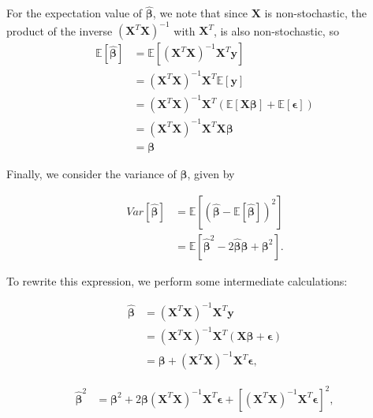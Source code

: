 \documentclass[12pt]{article}
\begin{document}
For the expectation value of $\hat{\boldsymbol{\beta}}$, we note that since $\mathbf{X}$ is non-stochastic, the product of the inverse $\left( \mathbf{X}^T \mathbf{X} \right)^{-1}$ with $\mathbf{X}^T$, is also non-stochastic, so
\begin{align}
    \mathbb{E} \left[ \hat{\boldsymbol{\beta}} \right] &= \mathbb{E} \left[ \left( \mathbf{X}^T \mathbf{X} \right)^{-1} \mathbf{X}^T \mathbf{y} \right] \nonumber\nonumber \\
    &= \left( \mathbf{X}^T \mathbf{X} \right)^{-1} \mathbf{X}^T \mathbb{E} \left[ \mathbf{y} \right] \nonumber\nonumber \\
    &= \left( \mathbf{X}^T \mathbf{X} \right)^{-1} \mathbf{X}^T \left( \mathbb{E} \left[ \mathbf{X}\boldsymbol{\beta}\right] + \mathbb{E} \left[\boldsymbol{\epsilon}\right] \right) \nonumber\nonumber \\
    &= \left( \mathbf{X}^T \mathbf{X} \right)^{-1} \mathbf{X}^T \mathbf{X}\boldsymbol{\beta} \nonumber\nonumber \\
    &= \boldsymbol{\beta}
\end{align}


Finally, we consider the variance of $\hat{\boldsymbol{\beta}}$, given by

\begin{align}
    Var \left[\hat{\boldsymbol{\beta}} \right] &= \mathbb{E} \left[ \left( \hat{\boldsymbol{\beta}} - \mathbb{E} \left[\hat{\boldsymbol{\beta}}  \right] \right)^2\right] \nonumber\nonumber \\
    &= \mathbb{E} \left[\hat{\boldsymbol{\beta}}^2 - 2\hat{\boldsymbol{\beta}}\boldsymbol{\beta}+\boldsymbol{\beta}^2 \right].
\end{align}

To rewrite this expression, we perform some intermediate calculations:

\begin{align}   
    \hat{\boldsymbol{\beta}} &= \left( \mathbf{X}^T \mathbf{X} \right)^{-1} \mathbf{X}^T \mathbf{y} \nonumber\nonumber \\
    &= \left( \mathbf{X}^T \mathbf{X} \right)^{-1} \mathbf{X}^T \left(\mathbf{X} \boldsymbol{\beta} + \boldsymbol{\epsilon}\right)  \nonumber\nonumber \\
    &= \boldsymbol{\beta} + \left( \mathbf{X}^T \mathbf{X} \right)^{-1} \mathbf{X}^T \boldsymbol{\epsilon},  
\end{align}

\begin{align}
    \hat{\boldsymbol{\beta}}^2 &= \boldsymbol{\beta}^2 +2\boldsymbol{\beta}\left( \mathbf{X}^T \mathbf{X} \right)^{-1} \mathbf{X}^T \boldsymbol{\epsilon} + \left[\left( \mathbf{X}^T \mathbf{X} \right)^{-1} \mathbf{X}^T \boldsymbol{\epsilon}\right]^2,
\end{align}
\end{document}

